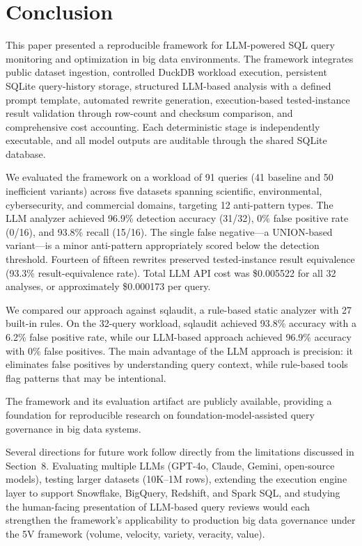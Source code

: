 \documentclass[conference]{IEEEtran}
\begin{document}
\section{Conclusion}
This paper presented a reproducible framework for LLM-powered SQL query monitoring and optimization in big data environments. The framework integrates public dataset ingestion, controlled DuckDB workload execution, persistent SQLite query-history storage, structured LLM-based analysis with a defined prompt template, automated rewrite generation, execution-based tested-instance result validation through row-count and checksum comparison, and comprehensive cost accounting. Each deterministic stage is independently executable, and all model outputs are auditable through the shared SQLite database.

We evaluated the framework on a workload of 91 queries (41 baseline and 50 inefficient variants) across five datasets spanning scientific, environmental, cybersecurity, and commercial domains, targeting 12 anti-pattern types. The LLM analyzer achieved 96.9\% detection accuracy (31/32), 0\% false positive rate (0/16), and 93.8\% recall (15/16). The single false negative---a UNION-based variant---is a minor anti-pattern appropriately scored below the detection threshold. Fourteen of fifteen rewrites preserved tested-instance result equivalence (93.3\% result-equivalence rate). Total LLM API cost was \$0.005522 for all 32 analyses, or approximately \$0.000173 per query.

We compared our approach against sqlaudit, a rule-based static analyzer with 27 built-in rules. On the 32-query workload, sqlaudit achieved 93.8\% accuracy with a 6.2\% false positive rate, while our LLM-based approach achieved 96.9\% accuracy with 0\% false positives. The main advantage of the LLM approach is precision: it eliminates false positives by understanding query context, while rule-based tools flag patterns that may be intentional.

The framework and its evaluation artifact are publicly available, providing a foundation for reproducible research on foundation-model-assisted query governance in big data systems.

Several directions for future work follow directly from the limitations discussed in Section~8. Evaluating multiple LLMs (GPT-4o, Claude, Gemini, open-source models), testing larger datasets (10K--1M rows), extending the execution engine layer to support Snowflake, BigQuery, Redshift, and Spark SQL, and studying the human-facing presentation of LLM-based query reviews would each strengthen the framework's applicability to production big data governance under the 5V framework (volume, velocity, variety, veracity, value).
\end{document}
